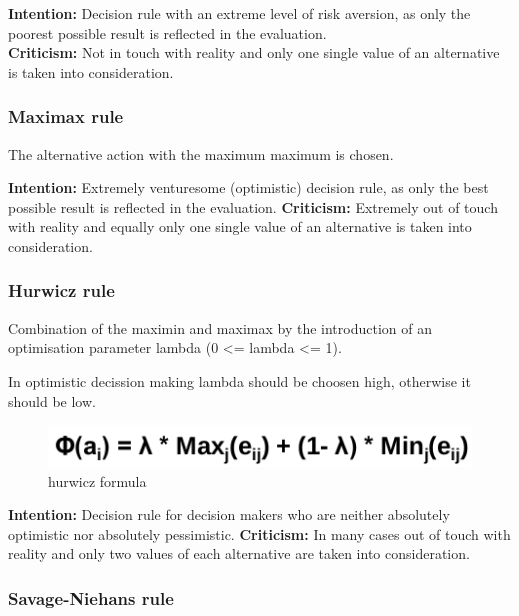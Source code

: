 \textbf{Intention:} Decision rule with an extreme level of risk
aversion, as only the poorest possible result is reflected in the
evaluation.\\
\textbf{Criticism:} Not in touch with reality and only one single value
of an alternative is taken into consideration.

\hypertarget{maximax-rule}{%
\subsubsection{Maximax rule}\label{maximax-rule}}

The alternative action with the maximum maximum is chosen.

\textbf{Intention:} Extremely venturesome (optimistic) decision rule, as
only the best possible result is reflected in the evaluation.
\textbf{Criticism:} Extremely out of touch with reality and equally only
one single value of an alternative is taken into consideration.

\hypertarget{hurwicz-rule}{%
\subsubsection{Hurwicz rule}\label{hurwicz-rule}}

Combination of the maximin and maximax by the introduction of an
optimisation parameter lambda (0 \textless{}= lambda \textless{}= 1).

In optimistic decission making lambda should be choosen high, otherwise
it should be low.

\begin{figure}
\centering
\includegraphics{figures/hurwicz.png}
\caption{hurwicz formula}
\end{figure}

\textbf{Intention:} Decision rule for decision makers who are neither
absolutely optimistic nor absolutely pessimistic. \textbf{Criticism:} In
many cases out of touch with reality and only two values of each
alternative are taken into consideration.

\hypertarget{savage-niehans-rule}{%
\subsubsection{Savage-Niehans rule}\label{savage-niehans-rule}}

